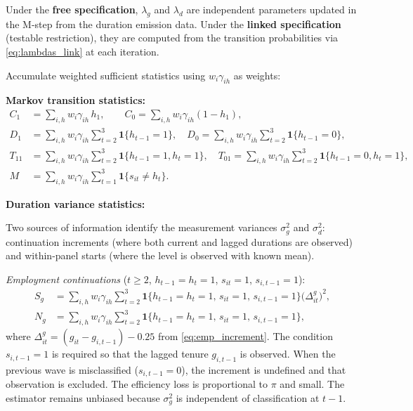 \documentclass[12pt]{article}
\begin{document}
Under the \textbf{free specification}, \(\lambda_g\) and \(\lambda_d\) are independent parameters updated in the M-step from the duration emission data. Under the \textbf{linked specification} (testable restriction), they are computed from the transition probabilities via \eqref{eq:lambdas_link} at each iteration.


\medskip

Accumulate weighted sufficient statistics using \(w_i\gamma_{ih}\) as weights:

\textbf{Markov transition statistics:}
\begin{align}
C_1 &= \sum_{i,h} w_i\gamma_{ih}\,h_1,\qquad C_0=\sum_{i,h} w_i\gamma_{ih}(1-h_1),\nonumber\\
D_1 &= \sum_{i,h} w_i\gamma_{ih}\sum_{t=2}^3 \mathbf{1}\{h_{t-1}=1\},\quad
D_0 = \sum_{i,h} w_i\gamma_{ih}\sum_{t=2}^3 \mathbf{1}\{h_{t-1}=0\},\nonumber\\
T_{11} &= \sum_{i,h} w_i\gamma_{ih}\sum_{t=2}^3 \mathbf{1}\{h_{t-1}=1,h_t=1\},\quad
T_{01} = \sum_{i,h} w_i\gamma_{ih}\sum_{t=2}^3 \mathbf{1}\{h_{t-1}=0,h_t=1\},\nonumber\\
M &= \sum_{i,h} w_i\gamma_{ih}\sum_{t=1}^3 \mathbf{1}\{s_{it}\neq h_t\}. \label{eq:suff_trans}
\end{align}

\textbf{Duration variance statistics:}

Two sources of information identify the measurement variances \(\sigma_g^2\) and \(\sigma_d^2\): continuation increments (where both current and lagged durations are observed) and within-panel starts (where the level is observed with known mean).

\emph{Employment continuations} (\(t\ge 2\), \(h_{t-1}=h_t=1\), \(s_{it}=1\), \(s_{i,t-1}=1\)):
\begin{align}
S_g &= \sum_{i,h} w_i\gamma_{ih}\sum_{t=2}^3\mathbf{1}\{h_{t-1}=h_t=1,\,s_{it}=1,\,s_{i,t-1}=1\} \big(\Delta^g_{it}\big)^2,\nonumber\\
N_g &= \sum_{i,h} w_i\gamma_{ih}\sum_{t=2}^3\mathbf{1}\{h_{t-1}=h_t=1,\,s_{it}=1,\,s_{i,t-1}=1\},
\label{eq:suff_gauss_g}
\end{align}
where \(\Delta^g_{it} = (g_{it}-g_{i,t-1}) - 0.25\) from \eqref{eq:emp_increment}. The condition \(s_{i,t-1}=1\) is required so that the lagged tenure \(g_{i,t-1}\) is observed. When the previous wave is misclassified (\(s_{i,t-1}=0\)), the increment is undefined and that observation is excluded. The efficiency loss is proportional to \(\pi\) and small. The estimator remains unbiased because \(\sigma_g^2\) is independent of classification at \(t-1\).
\end{document}
